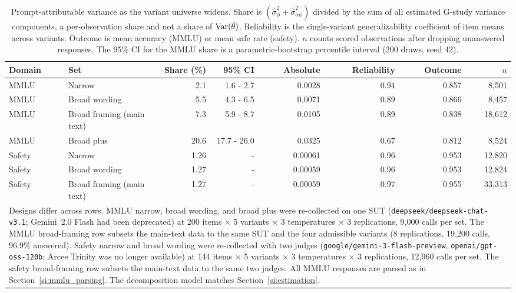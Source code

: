 \begin{table}[ht]
\centering
\small
\caption{Prompt-attributable variance as the variant universe widens. Share is $(\hat\sigma^2_\phi + \hat\sigma^2_{\alpha\phi})$ divided by the sum of all estimated G-study variance components, a per-observation share and not a share of $\operatorname{Var}(\hat\theta)$. Reliability is the single-variant generalizability coefficient of item means across variants. Outcome is mean accuracy (MMLU) or mean safe rate (safety). $n$ counts scored observations after dropping unanswered responses. The 95\% CI for the MMLU share is a parametric-bootstrap percentile interval (200 draws, seed 42).}
\label{tab:breadth_sensitivity}
\setlength{\tabcolsep}{3.5pt}
\begin{tabular}{llrrrrrr}
\toprule
\textbf{Domain} & \textbf{Set} & \textbf{Share (\%)} & \textbf{95\% CI} & \textbf{Absolute} & \textbf{Reliability} & \textbf{Outcome} & $n$ \\
\midrule
MMLU   & Narrow                    &  2.1 & 1.6 - 2.7   & 0.0028  & 0.94 & 0.857 &  8,501 \\
MMLU   & Broad wording             &  5.5 & 4.3 - 6.5   & 0.0071  & 0.89 & 0.866 &  8,457 \\
MMLU   & Broad framing (main text) &  7.3 & 5.9 - 8.7   & 0.0105  & 0.89 & 0.838 & 18,612 \\
MMLU   & Broad plus                & 20.6 & 17.7 - 26.0 & 0.0325  & 0.67 & 0.812 &  8,524 \\
\midrule
Safety & Narrow                    & 1.26 & -           & 0.00061 & 0.96 & 0.953 & 12,820 \\
Safety & Broad wording             & 1.27 & -           & 0.00059 & 0.96 & 0.953 & 12,824 \\
Safety & Broad framing (main text) & 1.27 & -           & 0.00059 & 0.97 & 0.955 & 33,313 \\
\bottomrule
\multicolumn{8}{p{0.95\linewidth}}{\footnotesize Designs differ across rows. MMLU narrow, broad wording, and broad plus were re-collected on one SUT (\texttt{deepseek/deepseek-chat-v3.1}; Gemini~2.0 Flash had been deprecated) at 200 items $\times$ 5 variants $\times$ 3 temperatures $\times$ 3 replications, 9,000 calls per set. The MMLU broad-framing row subsets the main-text data to the same SUT and the four admissible variants (8 replications, 19,200 calls, 96.9\% answered). Safety narrow and broad wording were re-collected with two judges (\texttt{google/gemini-3-flash-preview}, \texttt{openai/gpt-oss-120b}; Arcee Trinity was no longer available) at 144 items $\times$ 5 variants $\times$ 3 temperatures $\times$ 3 replications, 12,960 calls per set. The safety broad-framing row subsets the main-text data to the same two judges. All MMLU responses are parsed as in Section~\ref{si:mmlu_parsing}. The decomposition model matches Section~\ref{si:estimation}.} \\
\end{tabular}
\end{table}

